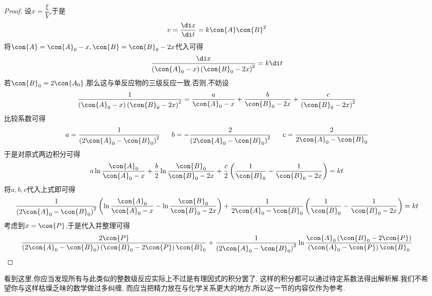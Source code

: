\documentclass{ctexart}
\begin{document}
\begin{proof}
    设$x=\dfrac{\xi}{V}$,于是
    \[v=\dfrac{\di x}{\di t}=k\con{A}\con{B}^2\]
    将$\con{A}=\con{A}_0-x,\con{B}=\con{B}_0-2x$代入可得
    \[\dfrac{\di x}{\left(\con{A}_0-x\right)\left(\con{B}_0-2x\right)^2}=k\di t\]
    若$\con{B}_0=2\con{A_0}$,那么这与单反应物的三级反应一致.否则,不妨设
    \[\dfrac{1}{\left(\con{A}_0-x\right)\left(\con{B}_0-2x\right)^2}
    =\dfrac{a}{\con{A}_0-x}+\dfrac{b}{\con{B}_0-2x}+\dfrac{c}{\left(\con{B}_0-2x\right)^2}\]
    比较系数可得
    \[a=\dfrac{1}{\left(2\con{A}_0-\con{B}_0\right)^2}\ \ \ \ \ 
    b=-\dfrac{2}{\left(2\con{A}_0-\con{B}_0\right)^2}\ \ \ \ \ 
    c=\dfrac{2}{2\con{A}_0-\con{B}_0}\]
    于是对原式两边积分可得
    \[a\ln\dfrac{\con{A}_0}{\con{A}_0-x}
    +\dfrac{b}{2}\ln\dfrac{\con{B}_0}{\con{B}_0-2x}
    +\dfrac{c}{2}\left(\dfrac{1}{\con{B}_0}-\dfrac{1}{\con{B}_0-2x}\right)=kt\]
    将$a,b,c$代入上式即可得
    \[\dfrac{1}{\left(2\con{A}_0-\con{B}_0\right)^2}
    \left(\ln\dfrac{\con{A}_0}{\con{A}_0-x}-\ln\dfrac{\con{B}_0}{\con{B}_0-2x}\right)
    +\dfrac{1}{2\con{A}_0-\con{B}_0}\left(\dfrac{1}{\con{B}_0}-\dfrac{1}{\con{B}_0-2x}\right)=kt\]
    考虑到$x=\con{P}$,于是代入并整理可得
    \[\dfrac{2\con{P}}{\left(2\con{A}_0-\con{B}_0\right)\left(\con{B}_0-2\con{P}\right)\con{B}_0}
    +\dfrac{1}{\left(2\con{A}_0-\con{B}_0\right)^2}\ln\dfrac{\con{A}_0\left(\con{B}_0-2\con{P}\right)}
    {\left(\con{A}_0-\con{P}\right)\con{B}_0}\]

\end{proof}
看到这里,你应当发现所有与此类似的整数级反应实际上不过是有理因式的积分罢了.%
这样的积分都可以通过待定系数法得出解析解.我们不希望你与这样枯燥乏味的数学做过多纠缠,%
而应当把精力放在与化学关系更大的地方,所以这一节的内容仅作为参考.
\end{document}
